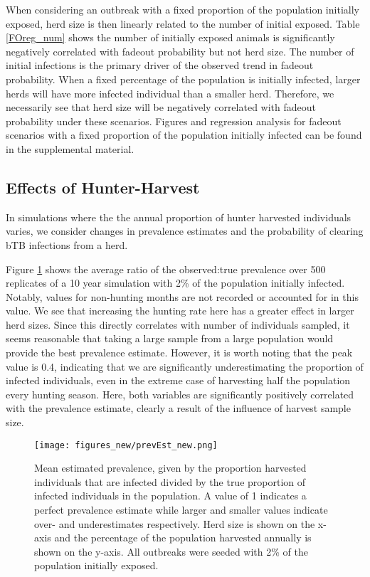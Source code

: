 \documentclass[number,preprint,review,12pt]{elsarticle}
\begin{document}
When considering an outbreak with a fixed proportion of the population initially exposed, herd size is then linearly related to the number of initial exposed. Table \ref{FOreg_num} shows the number of initially exposed animals is significantly negatively correlated with fadeout probability but not herd size. The number of initial infections is the primary driver of the observed trend in fadeout probability. When a fixed percentage of the population is initially infected, larger herds will have more infected individual than a smaller herd. Therefore, we necessarily see that herd size will be negatively correlated with fadeout probability under these scenarios. Figures and regression analysis for fadeout scenarios with a fixed proportion of the population initially infected can be found in the supplemental material.


\subsection{Effects of Hunter-Harvest}
In simulations where the the annual proportion of hunter harvested individuals varies, we consider changes in prevalence estimates and the probability of clearing bTB infections from a herd. 

Figure \ref{prev_est} shows the average ratio of the observed:true prevalence over 500 replicates of a 10 year simulation with 2\% of the population initially infected. Notably, values for non-hunting months are not recorded or accounted for in this value. We see that increasing the hunting rate here has a greater effect in larger herd sizes. Since this directly correlates with number of individuals sampled, it seems reasonable that taking a large sample from a large population would provide the best prevalence estimate. However, it is worth noting that the peak value is 0.4, indicating that we are significantly underestimating the proportion of infected individuals, even in the extreme case of harvesting half the population every hunting season. Here, both variables are significantly positively correlated with the prevalence estimate, clearly a result of the influence of harvest sample size.
\begin{figure}[H]
    \centering
    \texttt{[image: figures\_new/prevEst\_new.png]}
    \caption{Mean estimated prevalence, given by the proportion harvested individuals that are infected divided by the true proportion of infected individuals in the population. A value of 1 indicates a perfect prevalence estimate while larger and smaller values indicate over- and underestimates respectively. Herd size is shown on the x-axis and the percentage of the population harvested annually is shown on the y-axis.
    All outbreaks were seeded with 2\% of the population initially exposed.}
    \label{prev_est}
\end{figure}
\end{document}
